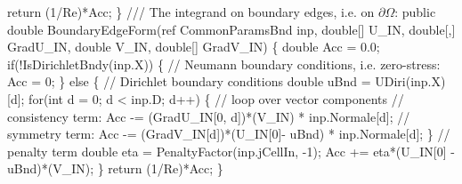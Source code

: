 {\btab \btab return (1/Re)*Acc;\newline 
 \newline 
\btab \}\newline 
 \newline 
    /// The integrand on boundary edges, i.e. on $\partial \Omega$:
\btab public double BoundaryEdgeForm(ref CommonParamsBnd inp, \newline 
\btab \btab double[] U\_IN, double[,] GradU\_IN, double V\_IN, double[] GradV\_IN) \{\newline 
 \newline 
 \newline 
\btab \btab double Acc = 0.0;\newline 
 \newline 
\btab \btab if(!IsDirichletBndy(inp.X)) \{\newline 
\btab \btab \btab // Neumann boundary conditions, i.e. zero-stress:\newline 
\btab \btab \btab Acc = 0;\newline 
\btab \btab \} else \{\newline 
\btab \btab \btab // Dirichlet boundary conditions\newline 
\btab \btab \btab double uBnd = UDiri(inp.X)[d];\newline 
 \newline 
\btab \btab \btab for(int d = 0; d < inp.D; d++) \{ // loop over vector components \newline 
\btab \btab \btab \btab // consistency term:\newline 
\btab \btab \btab \btab Acc -= (GradU\_IN[0, d])*(V\_IN) * inp.Normale[d];\newline 
\btab \btab \btab \btab // symmetry term:\newline 
\btab \btab \btab \btab Acc -= (GradV\_IN[d])*(U\_IN[0]- uBnd) * inp.Normale[d];\newline 
\btab \btab \btab \}\newline 
 \newline 
\btab \btab \btab // penalty term\newline 
\btab \btab \btab double eta = PenaltyFactor(inp.jCellIn, -1);\newline 
\btab \btab \btab Acc += eta*(U\_IN[0] - uBnd)*(V\_IN);\newline 
\btab \btab \}\newline 
 \newline 
\btab \btab return (1/Re)*Acc;\newline 
\btab \}\newline 
}

